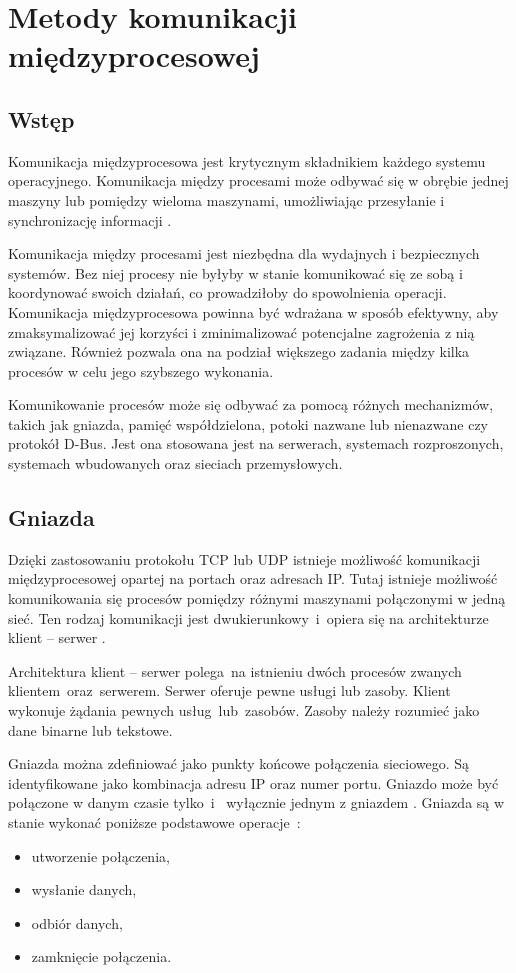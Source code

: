 \newpage
\section{Metody komunikacji międzyprocesowej}\label{multiprocessing}
{
    \subsection{Wstęp}
    {
        Komunikacja międzyprocesowa jest krytycznym składnikiem każdego systemu operacyjnego. Komunikacja między procesami może odbywać się w obrębie jednej maszyny lub pomiędzy wieloma maszynami, umożliwiając przesyłanie i synchronizację informacji \cite{com_distr}.
        
        Komunikacja między procesami jest niezbędna dla wydajnych i bezpiecznych systemów. Bez niej procesy nie byłyby w stanie komunikować się ze sobą i koordynować swoich działań, co prowadziłoby do spowolnienia operacji. Komunikacja międzyprocesowa powinna być wdrażana w sposób efektywny, aby zmaksymalizować jej korzyści i zminimalizować potencjalne zagrożenia z nią związane. Również pozwala ona na podział większego zadania między kilka procesów w celu jego szybszego wykonania.

        Komunikowanie procesów może się odbywać za pomocą różnych mechanizmów, takich jak gniazda, pamięć współdzielona, potoki nazwane lub nienazwane czy protokół D-Bus.
        Jest ona stosowana jest na serwerach, systemach rozproszonych, systemach wbudowanych oraz sieciach przemysłowych. 
    }
    \label{sock_desc}
    \subsection{Gniazda}
    {
        Dzięki zastosowaniu protokołu TCP lub UDP istnieje możliwość komunikacji międzyprocesowej opartej na portach oraz adresach IP. Tutaj istnieje możliwość komunikowania się procesów pomiędzy różnymi maszynami połączonymi w jedną sieć. Ten rodzaj komunikacji jest dwukierunkowy~i~opiera się na architekturze klient -- serwer \cite{sockets}.
        
        Architektura klient -- serwer polega na istnieniu dwóch procesów zwanych klientem~oraz~serwerem. Serwer oferuje pewne usługi lub zasoby. Klient wykonuje żądania pewnych usług~lub~zasobów. Zasoby należy rozumieć jako dane binarne lub tekstowe.

        Gniazda można zdefiniować jako punkty końcowe połączenia sieciowego. Są identyfikowane jako kombinacja adresu IP oraz numer portu. Gniazdo może być połączone w danym czasie tylko~i~ wyłącznie jednym z gniazdem \cite{sockets}. Gniazda są w stanie wykonać poniższe podstawowe operacje~\cite{sockets}:
        \begin{itemize}
            \item utworzenie połączenia,
            \item wysłanie danych,
            \item odbiór danych,
            \item zamknięcie połączenia.
        \end{itemize}

}}
